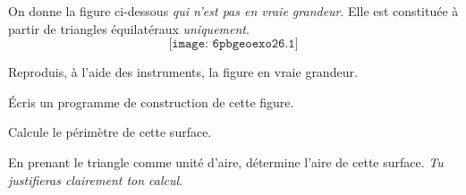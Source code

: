On donne la figure ci-dessous {\em qui n'est pas en vraie
  grandeur}. Elle est constituée à partir de triangles équilatéraux
{\em uniquement}.
\[\texttt{[image: 6pbgeoexo26.1]}\]
\begin{myenumerate}
  \item Reproduis, à l'aide des instruments, la figure en vraie grandeur.
  \item \'Ecris un programme de construction de cette figure.
  \item Calcule le périmètre de cette surface.
  \item En prenant le triangle  comme unité d'aire,
    détermine l'aire de cette surface. {\em Tu justifieras clairement
      ton calcul}.
\end{myenumerate}